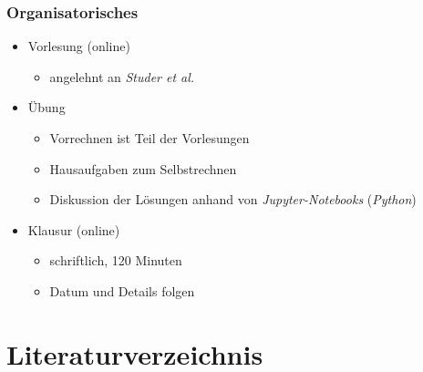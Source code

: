 \documentclass[hyperref={pdfpagemode=FullScreen, colorlinks=false}]{beamer}
\begin{document}
\begin{frame}
\frametitle{Organisatorisches}
    \begin{itemize}
        \item Vorlesung (online)
        \begin{itemize}
         \item angelehnt an \textsl{Studer et al.} \cite{studer2008bodendynamik}
        \end{itemize}
        
        \item Übung
                \begin{itemize} 
                \item Vorrechnen ist Teil der Vorlesungen
                \item Hausaufgaben zum Selbstrechnen
                \item Diskussion der Lösungen anhand von \textsl{Jupyter-Notebooks} (\textsl{Python})
        \end{itemize}

        \item Klausur (online)
        \begin{itemize}
         \item schriftlich, 120 Minuten
         \item Datum und Details folgen
        \end{itemize}
    \end{itemize}

\end{frame}

\section*{Literaturverzeichnis}

\begin{frame}[allowframebreaks]{}
	\printbibliography
\end{frame}
\end{document}
